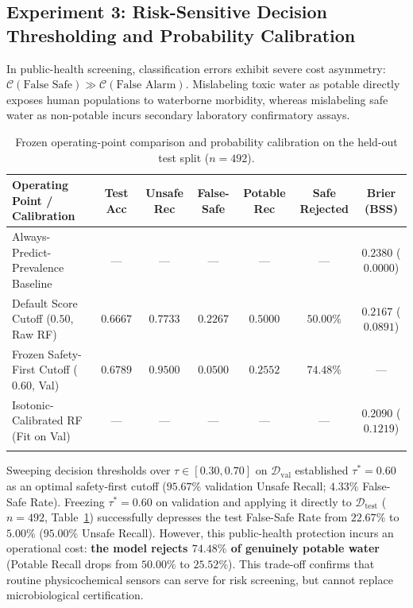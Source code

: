 \documentclass[pdflatex,sn-mathphys-num]{sn-jnl}%
\theoremstyle{thmstyleone}%
\theoremstyle{thmstyletwo}%
\theoremstyle{thmstylethree}%
\begin{document}
\subsection{Experiment 3: Risk-Sensitive Decision Thresholding and Probability Calibration}\label{subsec5_5}

In public-health screening, classification errors exhibit severe cost asymmetry: $\mathcal{C}(\text{False Safe}) \gg \mathcal{C}(\text{False Alarm})$. Mislabeling toxic water as potable directly exposes human populations to waterborne morbidity, whereas mislabeling safe water as non-potable incurs secondary laboratory confirmatory assays. 

\begin{table}[t]
\caption{Frozen operating-point comparison and probability calibration on the held-out test split ($n = 492$).}\label{tab:threshold_calib}%
\tiny\setlength{\tabcolsep}{1pt}
\begin{tabular*}{\textwidth}{@{\extracolsep\fill}lcccccc@{}}
\toprule
Operating Point / Calibration & Test Acc & Unsafe Rec & False-Safe & Potable Rec & Safe Rejected & Brier (BSS) \\
\midrule
Always-Predict-Prevalence Baseline & --- & --- & --- & --- & --- & $0.2380$ ($0.0000$) \\
Default Score Cutoff ($0.50$, Raw RF) & $0.6667$ & $0.7733$ & $0.2267$ & $\mathbf{0.5000}$ & $\mathbf{50.00\%}$ & $0.2167$ ($0.0891$) \\
Frozen Safety-First Cutoff ($0.60$, Val) & $\mathbf{0.6789}$ & $\mathbf{0.9500}$ & $\mathbf{0.0500}$ & $0.2552$ & $74.48\%$ & --- \\
Isotonic-Calibrated RF (Fit on Val) & --- & --- & --- & --- & --- & $\mathbf{0.2090}$ ($\mathbf{0.1219}$) \\
\botrule
\end{tabular*}
\end{table}

Sweeping decision thresholds over $\tau \in [0.30, 0.70]$ on $\mathcal{D}_{\text{val}}$ established $\tau^* = 0.60$ as an optimal safety-first cutoff ($95.67\%$ validation Unsafe Recall; $4.33\%$ False-Safe Rate). Freezing $\tau^* = 0.60$ on validation and applying it directly to $\mathcal{D}_{\text{test}}$ ($n = 492$, Table~\ref{tab:threshold_calib}) successfully depresses the test False-Safe Rate from $22.67\%$ to $\mathbf{5.00\%}$ ($95.00\%$ Unsafe Recall). However, this public-health protection incurs an operational cost: \textbf{the model rejects $\mathbf{74.48\%}$ of genuinely potable water} (Potable Recall drops from $50.00\%$ to $25.52\%$). This trade-off confirms that routine physicochemical sensors can serve for risk screening, but cannot replace microbiological certification.
\end{document}
